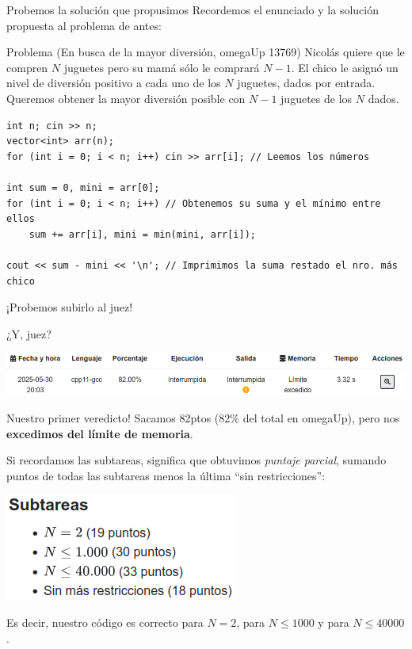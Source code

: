 \documentclass{beamer}
\begin{document}
    \begin{frame}[fragile]{Probemos la solución que propusimos}
        Recordemos el enunciado y la solución propuesta al problema de antes:\pause

        \begin{block}{Problema (En busca de la mayor diversión, omegaUp 13769)}
            Nicolás quiere que le compren $N$ juguetes pero su mamá sólo le comprará $N-1$. El chico le asignó un nivel de diversión positivo a cada uno de los $N$ juguetes, dados por entrada. Queremos obtener la mayor diversión posible con $N-1$ juguetes de los $N$ dados.
        \end{block}

        \pause
        \begin{verbatim}
int n; cin >> n;
vector<int> arr(n);
for (int i = 0; i < n; i++) cin >> arr[i]; // Leemos los números

int sum = 0, mini = arr[0];
for (int i = 0; i < n; i++) // Obtenemos su suma y el mínimo entre ellos
    sum += arr[i], mini = min(mini, arr[i]);

cout << sum - mini << '\n'; // Imprimimos la suma restado el nro. más chico
        \end{verbatim}
        \pause

        \begin{center}
            \LARGE ¡Probemos subirlo al juez!
        \end{center}
    \end{frame}

    \begin{frame}{¿Y, juez?}
        \pause
        \begin{center}
            \includegraphics[width=.9\linewidth]{./ou_problem_mle.png}
        \end{center} \pause

        Nuestro primer veredicto! \pause Sacamos 82ptos (82\% del total en omegaUp), pero nos \textbf{excedimos del límite de memoria}. \pause 

        Si recordamos las subtareas, significa que obtuvimos \textit{puntaje parcial}, sumando puntos de todas las subtareas menos la última ``sin restricciones'':

        \begin{center}
            \includegraphics[width=.25\linewidth]{./ou_subtasks.png}
        \end{center}\pause

        Es decir, nuestro código es correcto para $N = 2$, para $N \leq 1000$ y para $N \leq 40000$. 
    \end{frame}
\end{document}

